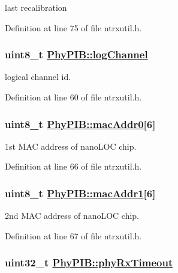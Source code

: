 last recalibration 

Definition at line 75 of file ntrxutil.h.\hypertarget{structPhyPIB_48bcd0749bde19da43893f434f1b9f37}{
\subsubsection[logChannel]{\setlength{\rightskip}{0pt plus 5cm}uint8\_\-t \hyperlink{structPhyPIB_48bcd0749bde19da43893f434f1b9f37}{Phy\-PIB::log\-Channel}}}
\label{structPhyPIB_48bcd0749bde19da43893f434f1b9f37}


logical channel id. 

Definition at line 60 of file ntrxutil.h.\hypertarget{structPhyPIB_68f03e4314b8c5b78fc11992c232ff5e}{
\subsubsection[macAddr0]{\setlength{\rightskip}{0pt plus 5cm}uint8\_\-t \hyperlink{structPhyPIB_68f03e4314b8c5b78fc11992c232ff5e}{Phy\-PIB::mac\-Addr0}\mbox{[}6\mbox{]}}}
\label{structPhyPIB_68f03e4314b8c5b78fc11992c232ff5e}


1st MAC address of nano\-LOC chip. 

Definition at line 66 of file ntrxutil.h.\hypertarget{structPhyPIB_5cd8ee4b722c3e7aea459b449b770147}{
\subsubsection[macAddr1]{\setlength{\rightskip}{0pt plus 5cm}uint8\_\-t \hyperlink{structPhyPIB_5cd8ee4b722c3e7aea459b449b770147}{Phy\-PIB::mac\-Addr1}\mbox{[}6\mbox{]}}}
\label{structPhyPIB_5cd8ee4b722c3e7aea459b449b770147}


2nd MAC address of nano\-LOC chip. 

Definition at line 67 of file ntrxutil.h.\hypertarget{structPhyPIB_916b1f69a27f327bdde9b8a04e68c719}{
\subsubsection[phyRxTimeout]{\setlength{\rightskip}{0pt plus 5cm}uint32\_\-t \hyperlink{structPhyPIB_916b1f69a27f327bdde9b8a04e68c719}{Phy\-PIB::phy\-Rx\-Timeout}}}
\label{structPhyPIB_916b1f69a27f327bdde9b8a04e68c719}


